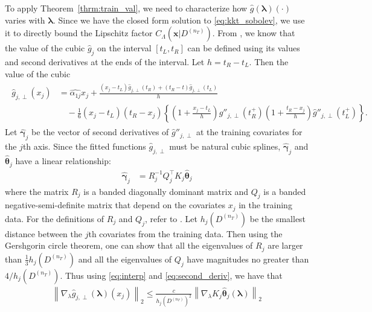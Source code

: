\documentclass[10pt]{book}
\theoremstyle{definition}
\begin{document}
	To apply Theorem~\ref{thrm:train_val}, we need to characterize how $\hat{g}(\boldsymbol{\lambda})(\cdot)$ varies with $\boldsymbol{\lambda}$.
	Since we have the closed form solution to \eqref{eq:kkt_sobolev}, we use it to directly bound the Lipschitz factor $C_\Lambda(\boldsymbol{x} | D^{(n_T)})$.
	From \citet{green1993nonparametric}, we know that the value of the cubic $\hat{g}_j$ on the interval $[t_L, t_R]$ can be defined using its values and second derivatives at the ends of the interval.
	Let $h = t_R - t_L$.
	Then the value of the cubic
	\begin{align}
	\begin{split}
	\hat{g}_{j,\perp}(x_j)
	& = \hat{\alpha_{1j}} x_j
	+ \frac{(x_j - t_L) \hat{g}_{j, \perp} (t_R) + (t_R - t) \hat{g}_{j, \perp}(t_L)}{h}\\
	& \quad - \frac{1}{6}(x_j - t_L)(t_R - x_j) \left\{
	\left(
	1 + \frac{x_j - t_L}{h}
	\right) \hat{g}''_{j, \perp}(t_R^+)
	\left(
	1 + \frac{t_R - x_j}{h}
	\right) \hat{g}''_{j, \perp}(t_L^+)
	\right \}.
	\label{eq:interp}
	\end{split}
	\end{align}
	Let $\hat{\boldsymbol{\gamma}}_j$ be the vector of second derivatives of $\hat{g}''_{j, \perp}$ at the training covariates for the $j$th axis.
	Since the fitted functions $\hat{g}_{j, \perp}$ must be natural cubic splines, $\hat{\boldsymbol{\gamma}}_j$ and $\hat{\boldsymbol{\theta}}_j$ have a linear relationship:
	\begin{align}
	\hat{\boldsymbol{\gamma}}_j & = R^{-1}_j Q^\top_j K_j \hat{\boldsymbol{\theta}}_j
	\label{eq:second_deriv}
	\end{align}
	where the matrix $R_j$ is a banded diagonally dominant matrix and $Q_j$ is a banded negative-semi-definite matrix that depend on the covariates $x_j$ in the training data.
	For the definitions of $R_j$ and $Q_j$, refer to \citet{green1993nonparametric}.
	Let $h_j(D^{(n_T)})$ be the smallest distance between the $j$th covariates from the training data.
	Then using the Gershgorin circle theorem, one can show that all the eigenvalues of $R_j$ are larger than $\frac{1}{3} h_j(D^{(n_T)})$ and all the eigenvalues of $Q_j$ have magnitudes no greater than $4/h_j(D^{(n_T)})$.
	Thus using \eqref{eq:interp} and \eqref{eq:second_deriv}, we have that
	\begin{align}
	\left \|
	\nabla_{\lambda} \hat{g}_{j, \perp}(\boldsymbol{\lambda})(x_j)
	\right \|_2
	\le
	\frac{c}{h_j(D^{(n_T)})^2}
	\left\|
	\nabla_{\lambda} K_j \hat{\boldsymbol{\theta}}_j(\boldsymbol{\lambda})
	\right \|_2
	\end{align}
\end{document}
